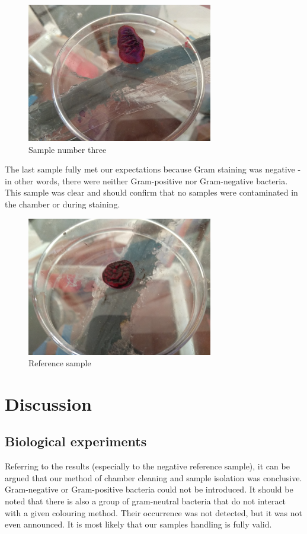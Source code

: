 \documentclass{cfp}
\begin{document}
\begin{figure}[!h]
\centering
\caption{Sample number three}
\includegraphics[width=230pt]{Sample-stem.jpg}
\end{figure}
\par
The last sample fully met our expectations because Gram staining was negative - in other words, there were neither Gram-positive nor Gram-negative bacteria. This sample was clear and should confirm that no samples were contaminated in the chamber or during staining.
\begin{figure}[!h]
\centering
\caption{Reference sample}
\includegraphics[width=230pt]{Reference_sample.jpg}
\end{figure}
\section{Discussion}
\subsection{Biological experiments}
\par
Referring to the results (especially to the negative reference sample), it can be argued that our method of chamber cleaning and sample isolation was conclusive. Gram-negative or Gram-positive bacteria could not be introduced. It should be noted that there is also a group of gram-neutral bacteria that do not interact with a given colouring method. Their occurrence was not detected, but it was not even announced. It is most likely that our samples handling is fully valid.
\end{document}
